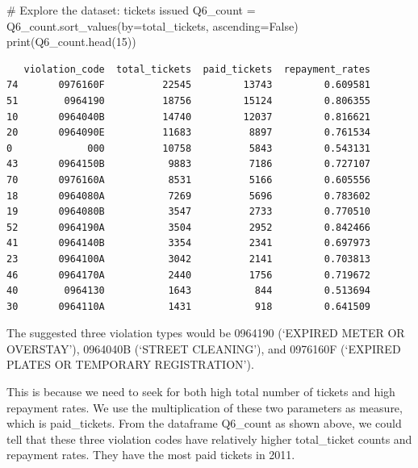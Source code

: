 \documentclass[
  letterpaper,
  DIV=11,
  numbers=noendperiod]{scrartcl}
\newenvironment{Shaded}{\begin{snugshade}}{\end{snugshade}}
\newcommand{\BuiltInTok}[1]{\textcolor[rgb]{0.00,0.23,0.31}{#1}}
\newcommand{\CommentTok}[1]{\textcolor[rgb]{0.37,0.37,0.37}{#1}}
\newcommand{\DecValTok}[1]{\textcolor[rgb]{0.68,0.00,0.00}{#1}}
\newcommand{\NormalTok}[1]{\textcolor[rgb]{0.00,0.23,0.31}{#1}}
\newcommand{\OperatorTok}[1]{\textcolor[rgb]{0.37,0.37,0.37}{#1}}
\newcommand{\StringTok}[1]{\textcolor[rgb]{0.13,0.47,0.30}{#1}}
\newcommand{\VariableTok}[1]{\textcolor[rgb]{0.07,0.07,0.07}{#1}}
\begin{document}
\begin{Shaded}
\begin{Highlighting}[]
\CommentTok{\# Explore the dataset: tickets issued}
\NormalTok{Q6\_count }\OperatorTok{=}\NormalTok{ Q6\_count.sort\_values(by}\OperatorTok{=}\StringTok{\textquotesingle{}total\_tickets\textquotesingle{}}\NormalTok{, ascending}\OperatorTok{=}\VariableTok{False}\NormalTok{)}
\BuiltInTok{print}\NormalTok{(Q6\_count.head(}\DecValTok{15}\NormalTok{))}
\end{Highlighting}
\end{Shaded}

\begin{verbatim}
   violation_code  total_tickets  paid_tickets  repayment_rates
74       0976160F          22545         13743         0.609581
51        0964190          18756         15124         0.806355
10       0964040B          14740         12037         0.816621
20       0964090E          11683          8897         0.761534
0             000          10758          5843         0.543131
43       0964150B           9883          7186         0.727107
70       0976160A           8531          5166         0.605556
18       0964080A           7269          5696         0.783602
19       0964080B           3547          2733         0.770510
52       0964190A           3504          2952         0.842466
41       0964140B           3354          2341         0.697973
23       0964100A           3042          2141         0.703813
46       0964170A           2440          1756         0.719672
40        0964130           1643           844         0.513694
30       0964110A           1431           918         0.641509
\end{verbatim}

The suggested three violation types would be 0964190 (`EXPIRED METER OR
OVERSTAY'), 0964040B (`STREET CLEANING'), and 0976160F (`EXPIRED PLATES
OR TEMPORARY REGISTRATION').

This is because we need to seek for both high total number of tickets
and high repayment rates. We use the multiplication of these two
parameters as measure, which is paid\_tickets. From the dataframe
Q6\_count as shown above, we could tell that these three violation codes
have relatively higher total\_ticket counts and repayment rates. They
have the most paid tickets in 2011.
\end{document}

